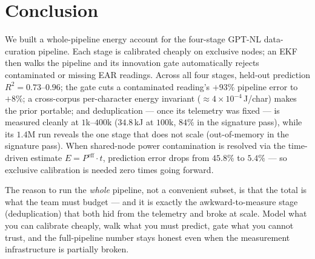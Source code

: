 \documentclass{article}
\begin{document}
\section{Conclusion}

We built a whole-pipeline energy account for the four-stage GPT-NL data-curation pipeline. Each stage is calibrated cheaply on exclusive nodes; an EKF then walks the pipeline and its innovation gate automatically rejects contaminated or missing EAR readings. Across all four stages, held-out prediction $R^2 = 0.73$--$0.96$; the gate cuts a contaminated reading's $+93\%$ pipeline error to $+8\%$; a cross-corpus per-character energy invariant (${\approx}4{\times}10^{-4}$\,J/char) makes the prior portable; and deduplication --- once its telemetry was fixed --- is measured cleanly at $1$k--$400$k ($34.8$\,kJ at $100$k, $84\%$ in the signature pass), while its $1.4$M run reveals the one stage that does not scale (out-of-memory in the signature pass). When shared-node power contamination is resolved via the time-driven estimate $E = P^{\mathrm{eff}} \cdot t$, prediction error drops from $45.8\%$ to $5.4\%$ --- so exclusive calibration is needed zero times going forward.

The reason to run the \emph{whole} pipeline, not a convenient subset, is that the total is what the team must budget --- and it is exactly the awkward-to-measure stage (deduplication) that both hid from the telemetry and broke at scale. Model what you can calibrate cheaply, walk what you must predict, gate what you cannot trust, and the full-pipeline number stays honest even when the measurement infrastructure is partially broken.




\end{document}
